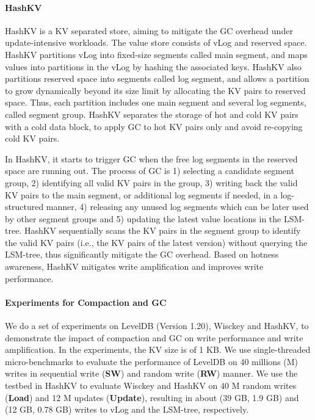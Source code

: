 \documentclass[sigconf]{acmart}
\begin{document}
\paragraph{HashKV} HashKV \cite{HashKV} is a KV separated store, aiming to mitigate the GC overhead under update-intensive workloads. The value store consists of vLog and reserved space. HashKV partitions vLog into fixed-size segments called main segment, and maps values into partitions in the vLog by hashing the associated keys. HashKV also partitions reserved space into segments called log segment, and allows a partition to grow dynamically beyond its size limit by allocating the KV pairs to reserved space. Thus, each partition includes one main segment and several log segments, called segment group. HashKV separates the storage of hot and cold KV pairs with a cold data block, to apply GC to hot KV pairs only and avoid re-copying cold KV pairs. 

In HashKV, it starts to trigger GC when the free log segments in the reserved space are running out. The process of GC is 1) selecting a candidate segment group, 2) identifying all valid KV pairs in the group, 3) writing back the valid KV pairs to the main segment, or additional log segments if needed, in a log-structured manner, 4) releasing any unused log segments which can be later used by other segment groups and 5) updating the latest value locations in the LSM-tree. HashKV sequentially scans the KV pairs in the segment group to identify the valid KV pairs (i.e., the KV pairs of the latest version) without querying the LSM-tree, thus significantly mitigate the GC overhead. Based on hotness awareness, HashKV mitigates write amplification and improves write performance.

\paragraph{Experiments for Compaction and GC} We do a set of experiments on LevelDB (Version 1.20), Wisckey and HashKV, to demonstrate the impact of compaction and GC on write performance and write amplification. In the experiments, the KV size is of 1 KB. We use single-threaded micro-benchmarks to evaluate the performance of LevelDB on 40 millions (M) writes in sequential write (\textbf{SW}) and random write (\textbf{RW}) manner. We use the testbed in HashKV \cite{HashKV} to evaluate Wisckey and HashKV on 40 M random writes (\textbf{Load}) and 12 M updates (\textbf{Update}), resulting in about (39 GB, 1.9 GB) and (12 GB, 0.78 GB) writes to vLog and the LSM-tree, respectively. 
\end{document}
